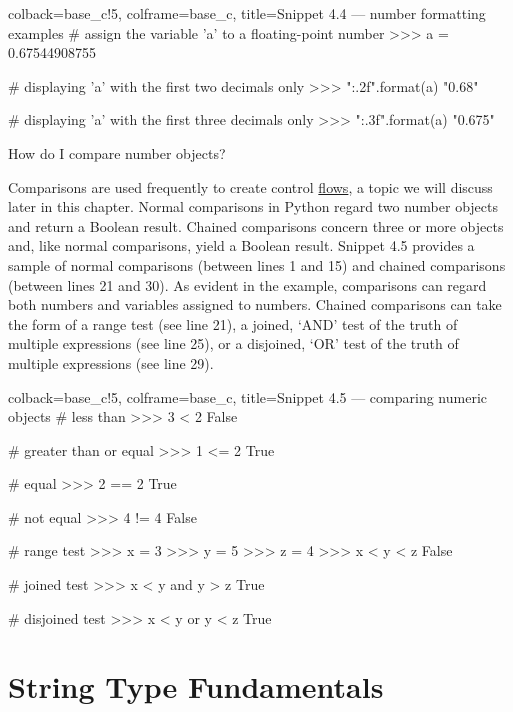 \documentclass[a4paper,11pt]{book}
\newcommand{\question}[1]{%
    \begin{tcolorbox}[colback=comp_c!10,colframe=comp_c,sidebyside align=top,width=\linewidth,before skip=1ex]
        #1
    \end{tcolorbox}
    \switchcolumn%
}
\newcommand{\note}[1]{%
    \begin{tcolorbox}[colback=white!0,colframe=white!10,width=\linewidth,before skip=1ex]
        #1
    \end{tcolorbox}
}
\begin{document}
\begin{pythoncode}[linenos=true,]{colback=base_c!5, colframe=base_c, title=\sffamily Snippet 4.4 --- number formatting examples}
# assign the variable 'a' to a floating-point number
>>> a = 0.67544908755

# displaying 'a' with the first two decimals only
>>> "{:.2f}".format(a)
"0.68"

# displaying 'a' with the first three decimals only
>>> "{:.3f}".format(a)
"0.675"
\end{pythoncode}

\begin{paracol}{2}
	\question{\raggedright{How do I compare number objects?}}
	\note{Comparisons are used frequently to create control \href{https://docs.python.org/3/tutorial/controlflow.html}{flows}, a topic we will discuss later in this chapter. Normal comparisons in Python regard two number objects and return a Boolean result. Chained comparisons concern three or more objects and, like normal comparisons, yield a Boolean result. Snippet 4.5 provides a sample of normal comparisons (between lines 1 and 15) and chained comparisons (between lines 21 and 30). As evident in the example, comparisons can regard both numbers and variables assigned to numbers. Chained comparisons can take the form of a range test (see line 21), a joined, `AND' test of the truth of multiple expressions (see line 25), or a disjoined, `OR' test of the truth of multiple expressions (see line 29).}
\end{paracol}

\begin{pythoncode}[linenos=true,]{colback=base_c!5, colframe=base_c, title=\sffamily Snippet 4.5 --- comparing numeric objects}
# less than
>>> 3 < 2
False

# greater than or equal
>>> 1 <= 2
True

# equal
>>> 2 == 2
True 

# not equal
>>> 4 != 4
False

# range test
>>> x = 3
>>> y = 5
>>> z = 4
>>> x < y < z
False

# joined test
>>> x < y and y > z
True

# disjoined test
>>> x < y or y < z
True 

\end{pythoncode}
\clearpage

\section{String Type Fundamentals}
\end{document}
